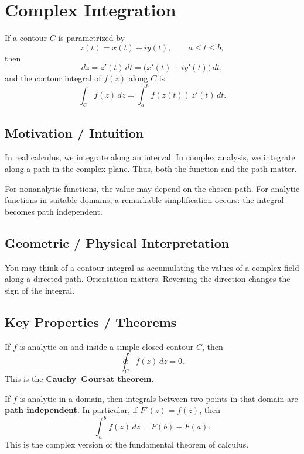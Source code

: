
\section{Complex Integration}

\begin{conceptbox}
    If a contour $C$ is parametrized by
    \[
        z(t)=x(t)+iy(t), \qquad a\le t\le b,
    \]
    then
    \[
        dz = z'(t)\,dt = \big(x'(t)+iy'(t)\big)\,dt,
    \]
    and the contour integral of $f(z)$ along $C$ is
    \[
        \int_C f(z)\,dz = \int_a^b f(z(t))\,z'(t)\,dt.
    \]
\end{conceptbox}

\subsection*{Motivation / Intuition}

In real calculus, we integrate along an interval. In complex analysis, we integrate along a path in the complex plane. Thus, both the function and the path matter.

For nonanalytic functions, the value may depend on the chosen path. For analytic functions in suitable domains, a remarkable simplification occurs: the integral becomes path independent.

\subsection*{Geometric / Physical Interpretation}

You may think of a contour integral as accumulating the values of a complex field along a directed path. Orientation matters. Reversing the direction changes the sign of the integral.

\subsection*{Key Properties / Theorems}

\begin{conceptbox}
    If $f$ is analytic on and inside a simple closed contour $C$, then
    \[
        \oint_C f(z)\,dz = 0.
    \]
    This is the \textbf{Cauchy--Goursat theorem}.
\end{conceptbox}

\begin{conceptbox}
    If $f$ is analytic in a domain, then integrals between two points in that domain are \textbf{path independent}. In particular, if $F'(z)=f(z)$, then
    \[
        \int_a^b f(z)\,dz = F(b)-F(a).
    \]
    This is the complex version of the fundamental theorem of calculus.
\end{conceptbox}

